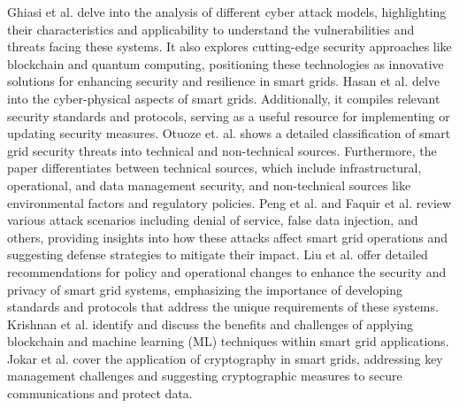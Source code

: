 \documentclass[10pt, journal]{IEEEtran}
\begin{document}
Ghiasi et al. \cite{ghiasi2023comprehensive} delve into the analysis of different cyber attack models, highlighting their characteristics and applicability to understand the vulnerabilities and threats facing these systems. It also explores cutting-edge security approaches like blockchain and quantum computing, positioning these technologies as innovative solutions for enhancing security and resilience in smart grids. Hasan et al. \cite{hasan2023review} delve into the cyber-physical aspects of smart grids. Additionally, it compiles relevant security standards and protocols, serving as a useful resource for implementing or updating security measures. Otuoze et. al. \cite{otuoze2018smart} shows a detailed classification of smart grid security threats into technical and non-technical sources. Furthermore, the paper differentiates between technical sources, which include infrastructural, operational, and data management security, and non-technical sources like environmental factors and regulatory policies. Peng et al. \cite {peng2019survey} and Faquir et al. \cite{faquir2021cybersecurity} review various attack scenarios including denial of service, false data injection, and others, providing insights into how these attacks affect smart grid operations and suggesting defense strategies to mitigate their impact. Liu et al. \cite{liu2012cyber} offer detailed recommendations for policy and operational changes to enhance the security and privacy of smart grid systems, emphasizing the importance of developing standards and protocols that address the unique requirements of these systems. Krishnan et al. \cite{mololoth2023blockchain} identify and discuss the benefits and challenges of applying blockchain and machine learning (ML) techniques within smart grid applications. Jokar et al. \cite{jokar2016survey} cover the application of cryptography in smart grids, addressing key management challenges and suggesting cryptographic measures to secure communications and protect data.
\end{document}
